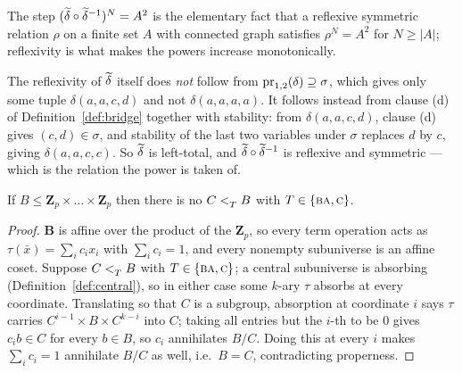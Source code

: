 \begin{hazard}\label{haz:linked-power}
The step $(\widetilde{\delta}\circ\widetilde{\delta}^{-1})^{N}=A^{2}$ is the elementary
fact that a reflexive symmetric relation $\rho$ on a finite set $A$ with
connected graph satisfies $\rho^{N}=A^{2}$ for $N\ge|A|$; reflexivity is what
makes the powers increase monotonically.

The reflexivity of $\widetilde{\delta}$ itself does \emph{not} follow from
$\operatorname*{pr}_{1,2}(\delta)\supseteq\sigma$, which gives only some tuple
$\delta(a,a,c,d)$ and not $\delta(a,a,a,a)$. It follows instead from clause (d)
of Definition~\ref{def:bridge} together with stability: from
$\delta(a,a,c,d)$, clause (d) gives $(c,d)\in\sigma$, and stability of the last
two variables under $\sigma$ replaces $d$ by $c$, giving $\delta(a,a,c,c)$. So
$\widetilde{\delta}$ is left-total, and $\widetilde{\delta}\circ\widetilde{\delta}^{-1}$ is
reflexive and symmetric --- which is the relation the power is taken of.
\end{hazard}

\begin{lemma}\label{lem:no-abs-in-linear}
If $B\le\mathbf Z_{p}\times\dots\times\mathbf Z_{p}$ then there is no
$C<_{T}^{}B$ with $T\in\{\textup{\textsc{ba}},\textup{\textsc{c}}\}$.
\end{lemma}

\begin{proof}
$\mathbf B$ is affine over the product of the $\mathbf Z_{p}$, so every term
operation acts as $\tau(\bar x)=\sum_{i}c_{i}x_{i}$ with $\sum_{i}c_{i}=1$, and
every nonempty subuniverse is an affine coset. Suppose $C<_{T}^{}B$ with
$T\in\{\textup{\textsc{ba}},\textup{\textsc{c}}\}$; a central subuniverse is absorbing
(Definition~\ref{def:central}), so in either case some $k$-ary $\tau$ absorbs
at every coordinate. Translating so that $C$ is a subgroup, absorption at
coordinate $i$ says $\tau$ carries $C^{i-1}\times B\times C^{k-i}$ into $C$;
taking all entries but the $i$-th to be $0$ gives $c_{i}b\in C$ for every
$b\in B$, so $c_{i}$ annihilates $B/C$. Doing this at every $i$ makes
$\sum_{i}c_{i}=1$ annihilate $B/C$ as well, i.e.\ $B=C$, contradicting
properness.
\end{proof}
